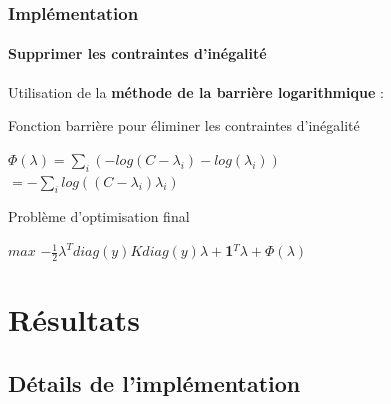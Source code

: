 \documentclass{beamer}
\begin{document}
\begin{frame}
\frametitle{Implémentation}
\framesubtitle{Supprimer les contraintes d'inégalité}

Utilisation de la \textbf{méthode de la barrière logarithmique} :

\pause

\begin{block}{Fonction barrière pour éliminer les contraintes d'inégalité}
          \begin{center}
          $\Phi(\lambda) = \sum_i (- log(C - \lambda_i) - log(\lambda_i))$\\
          $= - \sum_i log((C - \lambda_i)\lambda_i)$ 
          \end{center}
\end{block}

\pause

\begin{alertblock}{Problème d'optimisation final}
          \begin{center}
          $max$ $-\frac{1}{2}\lambda^Tdiag(y)Kdiag(y)\lambda+$\textbf{1}$^T\lambda + \Phi(\lambda)$\\ 
          \end{center}
\end{alertblock}

\end{frame}

\section{Résultats}

\subsection{Détails de l'implémentation}

\begin{frame}
\tableofcontents[currentsubsection]
\end{frame}
\end{document}
